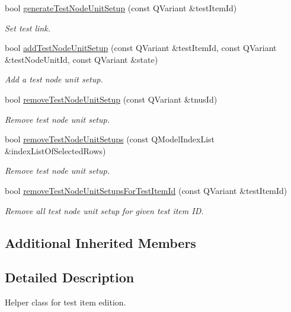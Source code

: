 \begin{DoxyCompactItemize}
bool \hyperlink{classmdt_tt_test_model_item_a5816e1b6dbde32d37a1956ca560c2195}{generate\-Test\-Node\-Unit\-Setup} (const Q\-Variant \&test\-Item\-Id)
\begin{DoxyCompactList}\small\item\em Set test link. \end{DoxyCompactList}\item 
bool \hyperlink{classmdt_tt_test_model_item_acac991609d4e4b39404cf1be14928947}{add\-Test\-Node\-Unit\-Setup} (const Q\-Variant \&test\-Item\-Id, const Q\-Variant \&test\-Node\-Unit\-Id, const Q\-Variant \&state)
\begin{DoxyCompactList}\small\item\em Add a test node unit setup. \end{DoxyCompactList}\item 
bool \hyperlink{classmdt_tt_test_model_item_a6424038eadcf2e2d11ee5aa269b562c7}{remove\-Test\-Node\-Unit\-Setup} (const Q\-Variant \&tnus\-Id)
\begin{DoxyCompactList}\small\item\em Remove test node unit setup. \end{DoxyCompactList}\item 
bool \hyperlink{classmdt_tt_test_model_item_a3e6d86258dde0d8cb0fb14e9195cabd9}{remove\-Test\-Node\-Unit\-Setups} (const Q\-Model\-Index\-List \&index\-List\-Of\-Selected\-Rows)
\begin{DoxyCompactList}\small\item\em Remove test node unit setup. \end{DoxyCompactList}\item 
bool \hyperlink{classmdt_tt_test_model_item_ac45849becd11e9206b2d696e0346ba71}{remove\-Test\-Node\-Unit\-Setups\-For\-Test\-Item\-Id} (const Q\-Variant \&test\-Item\-Id)
\begin{DoxyCompactList}\small\item\em Remove all test node unit setup for given test item I\-D. \end{DoxyCompactList}\end{DoxyCompactItemize}
\subsection*{Additional Inherited Members}


\subsection{Detailed Description}
Helper class for test item edition. 

